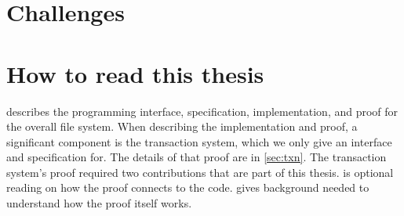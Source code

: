 
\section{Challenges}

\section{How to read this thesis}

 describes the programming interface, specification,
implementation, and proof for the overall file system. When describing the
implementation and proof, a significant component is the transaction system,
which we only give an interface and specification for. The details of that proof
are in \cref{sec:txn}. The transaction system's proof required two
contributions that are part of this thesis.  is optional
reading on how the proof connects to the code.  gives
background needed to understand how the proof itself works.
